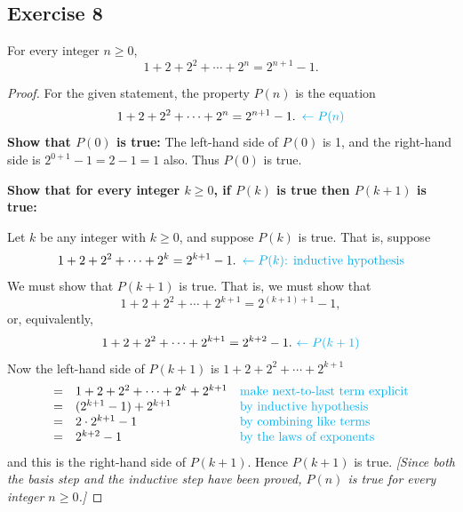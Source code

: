 \documentclass[14pt]{extarticle}
\newcommand{\from}{\leftarrow}
\newcommand{\cy}{\color{cyan}}
\begin{document}
\subsection{Exercise 8}
For every integer $n \geq 0$,
\[
1 + 2 + 2^2 + \cdots + 2^n = 2^{n+1} - 1.
\]
\begin{proof}
For the given statement, the property $P(n)$ is the equation
\[
1 + 2 + 2^2 + \cdots + 2^n = 2^{n+1} - 1. \,\,\, {\cy \from P(n)}
\]
{\bf Show that $P(0)$ is true:} The left-hand side of $P(0)$ is 1, and the right-hand side is $2^{0+1} - 1 = 2 - 1 = 1$ also. Thus $P(0)$ is true.

{\bf Show that for every integer $k \geq 0$, if $P(k)$ is true then $P(k + 1)$ is true:}

Let $k$ be any integer with $k \geq 0$, and suppose $P(k)$ is true. That is, suppose
\[
1 + 2 + 2^2 + \cdots + 2^k = 2^{k+1} - 1. \,\,\, {\cy \from P(k) \text{: inductive hypothesis}}
\]
We must show that $P(k + 1)$ is true. That is, we must show that
\[
1 + 2 + 2^2 + \cdots + 2^{k+1} = 2^{(k+1)+1} - 1,
\]
or, equivalently,
\[
1 + 2 + 2^2 + \cdots + 2^{k+1} = 2^{k+2} - 1. \,\, {\cy \from P(k + 1)}
\]
Now the left-hand side of $P(k + 1)$ is $1 + 2 + 2^2 + \cdots + 2^{k+1}$
\[
\begin{array}{lll}
= & 1 + 2 + 2^2 + \cdots + 2^k + 2^{k+1} & \text{\cy make next-to-last term explicit} \\
= & (2^{k+1} - 1) + 2^{k+1} & \text{\cy by inductive hypothesis} \\
= & 2 \cdot 2^{k+1} - 1& \text{\cy by combining like terms} \\
= & 2^{k+2} - 1& \text{\cy by the laws of exponents} 
\end{array}
\]
and this is the right-hand side of $P(k + 1)$. Hence $P(k + 1)$ is true. {\it [Since both the basis step and the inductive step have been proved, $P(n)$ is true for every integer $n \geq 0$.]}
\end{proof}
\end{document}
